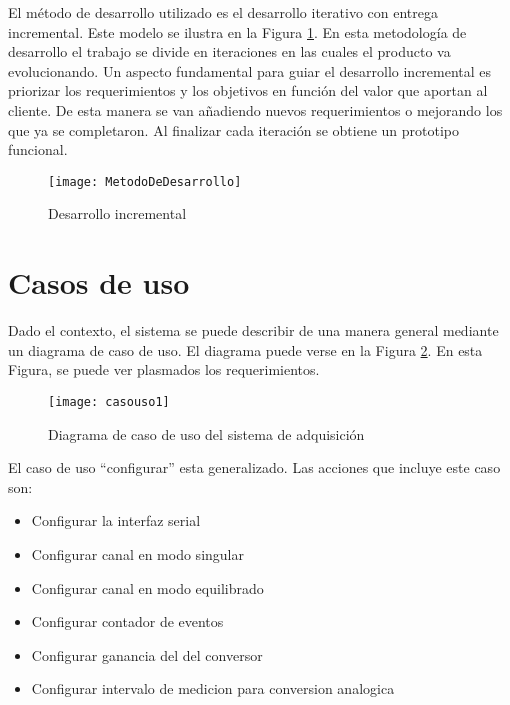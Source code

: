 El método de desarrollo utilizado es el desarrollo iterativo con entrega incremental. Este modelo se ilustra en la Figura \ref{fig:MetodoDeDesarrollo}. En esta metodología de desarrollo el trabajo se divide en iteraciones en las cuales el producto va evolucionando. 
Un aspecto fundamental para guiar el desarrollo incremental es priorizar los requerimientos y los objetivos en función del valor que aportan al cliente. De esta manera se van añadiendo nuevos requerimientos o mejorando los que ya se completaron. Al finalizar cada iteración se obtiene un prototipo funcional.

\begin{figure}[h]
  \centering
  \texttt{[image: MetodoDeDesarrollo]}
  \caption{Desarrollo incremental}\label{fig:MetodoDeDesarrollo}
\end{figure}


\section{Casos de uso} %
\label{sec:casos_de_uso}

Dado el contexto, el sistema se puede describir de una manera general mediante un diagrama de caso de uso. El diagrama puede verse en la Figura \ref{fig:casouso1}. En esta Figura, se puede ver plasmados los requerimientos.

\begin{figure}[h]
  \centering
  \texttt{[image: casouso1]}
  \caption{Diagrama de caso de uso del sistema de adquisición}\label{fig:casouso1}
\end{figure}

El caso de uso ``configurar'' esta generalizado. Las acciones que incluye este caso son:
\begin{itemize}
	\item Configurar la interfaz serial
	\item Configurar canal en modo singular
	\item Configurar canal en modo equilibrado
	\item Configurar contador de eventos
	\item Configurar ganancia del del conversor
	\item Configurar intervalo de medicion para conversion analogica
\end{itemize}


